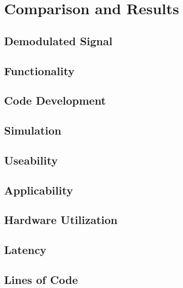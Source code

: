 \chapter{Comparison and Results}
\label{cha:ComparisonAndResults}
  \section{Demodulated Signal}

  \section{Functionality}

  \section{Code Development}

  \section{Simulation}

  \section{Useability}

  \section{Applicability}

  \section{Hardware Utilization}

  \section{Latency}

  \section{Lines of Code}

